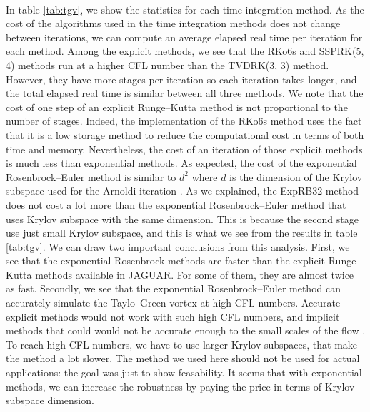       \paragraph{}
      In table \ref{tab:tgv}, we show the statistics for each time integration method.
      As the cost of the algorithms used in the time integration methods does not change between iterations, we can compute an average elapsed real time per iteration for each method.
      Among the explicit methods, we see that the RKo6s and SSPRK(5, 4) methods run at a higher CFL number than the TVDRK(3, 3) method.
      However, they have more stages per iteration so each iteration takes longer, and the total elapsed real time is similar between all three methods.
      We note that the cost of one step of an explicit Runge--Kutta method is not proportional to the number of stages.
      Indeed, the implementation of the RKo6s method uses the fact that it is a low storage method to reduce the computational cost in terms of both time and memory.
      Nevertheless, the cost of an iteration of those explicit methods is much less than exponential methods.
      As expected, the cost of the exponential Rosenbrock--Euler method is similar to $d^2$ where $d$ is the dimension of the Krylov subspace used for the Arnoldi iteration .
      As we explained, the ExpRB32 method does not cost a lot more than the exponential Rosenbrock--Euler method that uses Krylov subspace with the same dimension.
      This is because the second stage use just small Krylov subspace, and this is what we see from the results in table \ref{tab:tgv}.
      We can draw two important conclusions from this analysis.
      First, we see that the exponential Rosenbrock methods are faster than the explicit Runge--Kutta methods available in JAGUAR.
      For some of them, they are almost twice as fast.
      Secondly, we see that the exponential Rosenbrock--Euler method can accurately simulate the Taylo--Green vortex at high CFL numbers.
      Accurate explicit methods would not work with such high CFL numbers, and implicit methods that could would not be accurate enough to  the small scales of the flow .
      To reach high CFL numbers, we have to use larger Krylov subspaces, that make the method a lot slower.
      The method we used here should not be used for actual applications: the goal was just to show feasability.
      It seems that with exponential methods, we can increase the robustness by paying the price in terms of Krylov subspace dimension.

